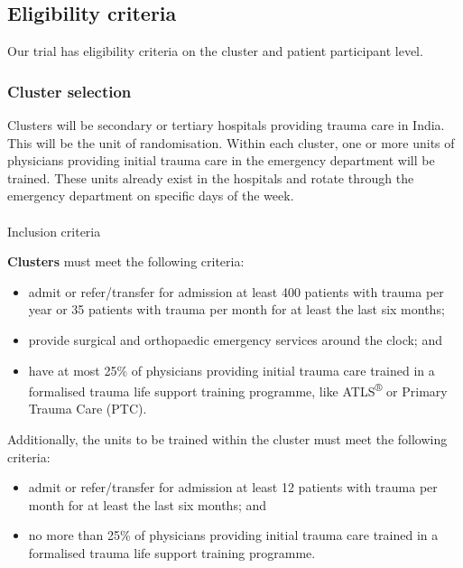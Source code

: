 \documentclass[
]{scrartcl}
\makeatletter
\let\oldparagraph\paragraph
\renewcommand{\paragraph}{
    \@ifstar
      \xxxParagraphStar
      \xxxParagraphNoStar
  }
\newcommand{\xxxParagraphStar}[1]{\oldparagraph*{#1}\mbox{}}
\newcommand{\xxxParagraphNoStar}[1]{\oldparagraph{#1}\mbox{}}
\providecommand{\tightlist}{%
  \setlength{\itemsep}{0pt}\setlength{\parskip}{0pt}}\usepackage{longtable,booktabs,array}
\makeatother
\begin{document}
\subsection{Eligibility criteria}\label{eligibility-criteria}

Our trial has eligibility criteria on the cluster and patient
participant level.

\subsubsection{Cluster selection}\label{cluster-selection}

Clusters will be secondary or tertiary hospitals providing trauma care
in India. This will be the unit of randomisation. Within each cluster,
one or more units of physicians providing initial trauma care in the
emergency department will be trained. These units already exist in the
hospitals and rotate through the emergency department on specific days
of the week.

\paragraph{Inclusion criteria}\label{inclusion-criteria}

\textbf{Clusters} must meet the following criteria:

\begin{itemize}
\tightlist
\item
  admit or refer/transfer for admission at least 400 patients with
  trauma per year or 35 patients with trauma per month for at least the
  last six months;
\item
  provide surgical and orthopaedic emergency services around the clock;
  and
\item
  have at most 25\% of physicians providing initial trauma care trained
  in a formalised trauma life support training programme, like
  ATLS\textsuperscript{®} or Primary Trauma Care (PTC).
\end{itemize}

Additionally, the units to be trained within the cluster must meet the
following criteria:

\begin{itemize}
\tightlist
\item
  admit or refer/transfer for admission at least 12 patients with trauma
  per month for at least the last six months; and
\item
  no more than 25\% of physicians providing initial trauma care trained
  in a formalised trauma life support training programme.
\end{itemize}
\end{document}
